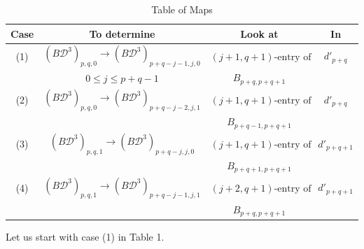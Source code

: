 \begin{table}[h]
\caption{Table of Maps}
\begin{center}
\begin{tabular}{|c|c|c|c|} \hline
Case  
               & To determine                     
                                     & Look at              
                                             &   In       
 \\ \hline \hline
(1) 
               & $(B{\mathcal D}^3)_{p,q,0} \rightarrow (B{\mathcal D}^3)_{p+q-j-1,j,0}$  
                                    & $(j{+}1,q{+}1)\text{-entry of}$   
                                             &  $d'_{p+q}$          
\\ 
               & $0\leq j\leq p+q-1$ 
                                    & $B_{p+q,p+q+1}$               
                                             &                    
\\ \hline
(2) 
     & $(B{\mathcal D}^3)_{p,q,0}\rightarrow  (B{\mathcal D}^3)_{p+q-j-2,j,1}$  
               & $(j{+}1,q{+}1)\text{-entry of}$  
                                             &  $d'_{p+q}$          
\\ 
    & 
               & $B_{p+q-1,p+q+1}$             
                                             &                    
\\ \hline
(3) 
     & $(B{\mathcal D}^3)_{p,q,1}\rightarrow  (B{\mathcal D}^3)_{p+q-j,j,0}$    
               & $(j{+}1,q{+}1)\text{-entry of}$   
                                              &  $d'_{p+q+1}$        
\\ 
    & 
    
               & $B_{p+q+1,p+q+1}$             &                    
\\ \hline
(4) 
     & $(B{\mathcal D}^3)_{p,q,1}\rightarrow  (B{\mathcal D}^3)_{p+q-j-1,j,1}$  
             & $(j{+}2,q{+}1)\text{-entry of}$   
                                               &  $d'_{p+q+1}$        
\\
    &  
             & $B_{p+q,p+q+1}$                 &                    
\\ \hline
\end{tabular}
\end{center}
\end{table}

Let us start with case (1) in Table 1.
